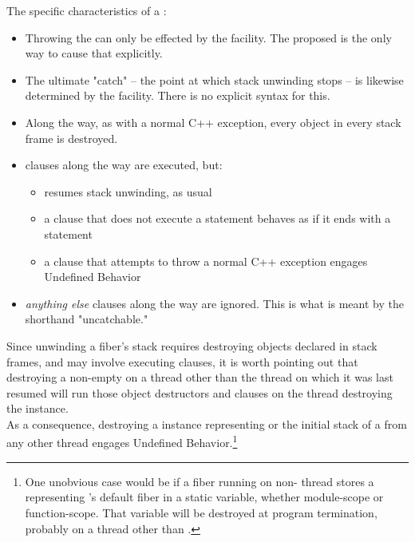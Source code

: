 The specific characteristics of a \foreignex:

\begin{itemize}
    \item Throwing the \foreignex can only be effected by the \fiber
    facility. The proposed \unwindfib is the only way to cause that
    explicitly.
    \item The ultimate "catch" -- the point at which stack unwinding stops --
    is likewise determined by the \fiber facility. There is no explicit syntax
    for this.
    \item Along the way, as with a normal C++ exception, every object in every
    stack frame is destroyed.
    \item {} clauses along the way are executed, but:
    \begin{itemize}
        \item {} resumes stack unwinding, as usual
        \item a  clause that does not execute a 
        statement behaves as if it ends with a  statement
        \item a  clause that attempts to throw a normal C++
        exception engages Undefined Behavior
    \end{itemize}
    \item {}\emph{anything else}\cpp{)} clauses along the way are ignored. This is
    what is meant by the shorthand "uncatchable."
\end{itemize}

Since unwinding a fiber's stack requires destroying objects declared in stack
frames, and may involve executing  clauses, it is worth
pointing out that destroying a non-empty \fiber on a thread other than the
thread on which it was last resumed will run those object destructors
and  clauses on the thread destroying the \fiber instance.\\

As a consequence, destroying a \fiber instance representing \main or
the initial stack of a \thread from any other thread engages Undefined
Behavior.\footnote{One unobvious case would be if a fiber running on non-\main
thread  stores a \fiber representing 's default fiber in a static
variable, whether module-scope or function-scope. That variable will be
destroyed at program termination, probably on a thread other than .}\\

